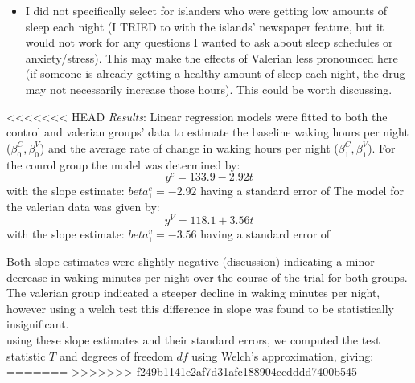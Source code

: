 \documentclass[10pt,preprintnumbers,amsmath,amssymb,floatfix,twocolumn,prl]{revtex4-2}
\begin{document}
\begin{itemize}
\item I did not specifically select for islanders who were getting low amounts of sleep each night (I TRIED to with the islands' newspaper feature, but it would not work for any questions I wanted to ask about sleep schedules or anxiety/stress). This may make the effects of Valerian less pronounced here (if someone is already getting a healthy amount of sleep each night, the drug may not necessarily increase those hours). This could be worth discussing.
\end{itemize}

<<<<<<< HEAD
\textit{Results}: Linear regression models were fitted to both the control and valerian groups' data to estimate the baseline waking hours per night ($\beta_0^C, \beta_0^V$) and the average rate of change in waking hours per night ($\beta_1^C, \beta_1^V$). For the conrol group the model was determined by: \\
$$y^c = 133.9 - 2.92 t$$
with the slope estimate: $beta_1^c = - 2.92$ having a standard error of 
The model for the valerian data was given by: \\
$$y^V = 118.1 + 3.56 t$$
with the slope estimate: $beta_1^v = - 3.56$ having a standard error of 

Both slope estimates were slightly negative (discussion) indicating a minor decrease in waking minutes per night over the course of the trial for both groups. The valerian group indicated a steeper decline in waking minutes per night, however using a welch test this difference in slope was found to be statistically insignificant. \\
using these slope estimates and their standard errors, we computed the test statistic $T$ and degrees of freedom $df$ using Welch's approximation, giving: \\



=======
>>>>>>> f249b1141e2af7d31afc188904ccdddd7400b545


\end{document}
